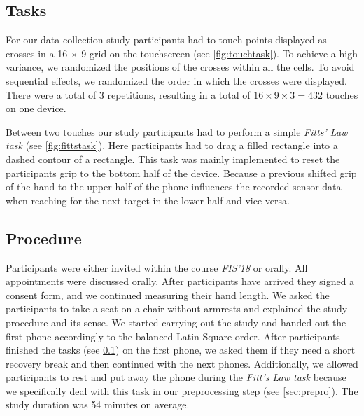 \subsection{Tasks}
\label{sec:tasks}




For our data collection study participants had to touch points displayed as crosses in a 16 $ \times $ 9 grid on the touchscreen (see \cref{fig:touchtask}). 
To achieve a high variance, we randomized the positions of the crosses within all the cells.
To avoid sequential effects, we randomized the order in which the crosses were displayed.
There were a total of 3 repetitions, resulting in a total  of $ 16 \times 9 \times 3 = 432 $ touches on one device.

Between two touches our study participants had to perform a simple \textit{Fitts' Law task} (see \cref{fig:fittstask}). 
Here participants had to drag a filled rectangle into a dashed contour of a rectangle.
This task was mainly implemented to reset the participants grip to the bottom half of the device.
Because a previous shifted grip of the hand to the upper half of the phone influences the recorded sensor data when reaching for the next target in the lower half and vice versa.
\subsection{Procedure}
Participants were either invited within the course \textit{FIS'18} or orally.
All appointments were discussed orally.
After participants have arrived they signed a consent form, and we continued measuring their hand length.
We asked the participants to take a seat on a chair without armrests and explained the study procedure and its sense.
We started carrying out the study and handed out the first phone accordingly to the balanced Latin Square order. 
After participants finished the tasks (see \cref{sec:tasks}) on the first phone, we asked them if they need a short recovery break and then continued with the next phones.
Additionally, we allowed participants to rest and put away the phone during the \textit{Fitt's Law task} because we specifically deal with this task in our preprocessing step (see \cref{sec:prepro}).
The study duration was 54 minutes on average.

